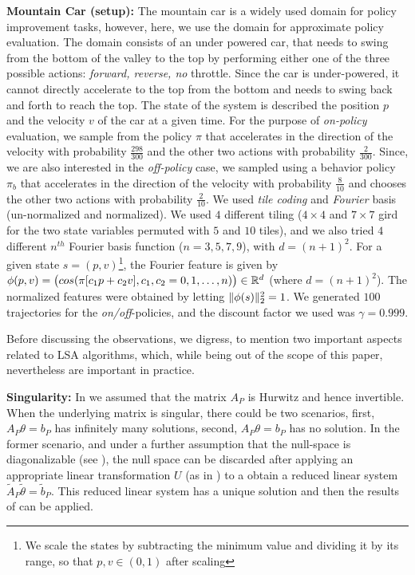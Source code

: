 \textbf{Mountain Car (setup):}  The mountain car is a widely used domain for policy improvement tasks, however, here, we use the domain for approximate policy evaluation. The domain consists of an under powered car, that needs to swing from the bottom of the valley to the top by performing either one of the three possible actions: \emph{forward, reverse, no} throttle. Since the car is under-powered, it cannot directly accelerate to the top from the bottom and needs to swing back and forth to reach the top. The state of the system is described the position $p$ and the velocity $v$ of the car at a given time. For the purpose of \emph{on-policy} evaluation, we sample from the policy $\pi$ that accelerates in the direction of the velocity with probability $\frac{298}{300}$ and the other two actions with probability $\frac{2}{300}$. Since, we are also interested in the \emph{off-policy} case, we sampled using a behavior policy  $\pi_b$ that accelerates in the direction of the velocity with probability $\frac{8}{10}$ and chooses the other two actions with probability $\frac{2}{10}$. We used \emph{tile coding} and \emph{Fourier} basis (un-normalized and normalized). We used $4$ different tiling ($4\times 4$ and $7\times 7$ gird for the two state variables permuted with $5$ and $10$ tiles), and we also tried $4$ different $n^{th}$ Fourier basis function ($n=3,5,7,9$), with $d=(n+1)^2$. For a given state $s=(p,v)$\footnote{We scale the states by subtracting the minimum value and dividing it by its range, so that $p,v\in(0,1)$ after scaling}, the Fourier feature is given by $\phi(p,v)=\big(cos(\pi [c_1p+c_2 v],c_1,c_2=0,1,\ldots,n)\big) \in \mathbb{R}^{d}$ (where $d=(n+1)^2$). The normalized features were obtained by letting $\| \phi(s)\|^2_2=1$. We generated $100$ trajectories for the \emph{on/off}-policies, and the discount factor we used was $\gamma=0.999$. 

Before discussing the observations, we digress, to mention two important aspects related to LSA algorithms, which, while being out of the scope of this paper, nevertheless are important in practice.

\textbf{Singularity:} In  we assumed that the matrix $A_P$ is Hurwitz and hence invertible. When the underlying matrix is singular, there could be two scenarios, first,  $A_P\theta=b_P$ has infinitely many solutions, second, $A_P\theta=b_P$ has no solution. In the former scenario, and under a further assumption that the null-space is diagonalizable (see \cite{bertstab}), the null space can be discarded after applying an appropriate linear transformation $U$ (as in ) to a obtain a reduced linear system $\tilde{A}_P\tilde{\theta}=\tilde{b}_P$. This reduced linear system has a unique solution and then the results of  can be applied.

